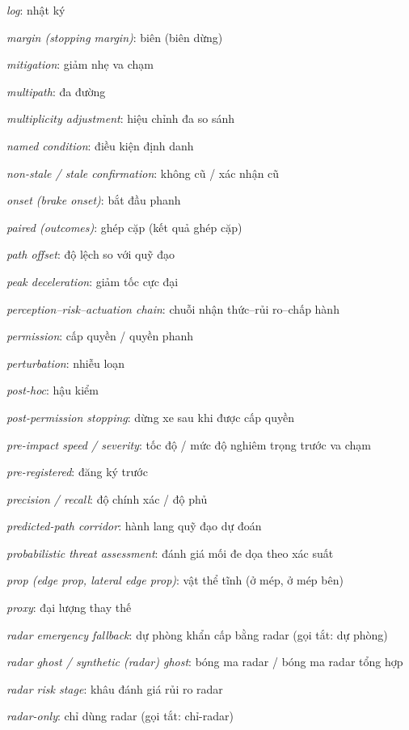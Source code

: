 \documentclass[conference]{IEEEtran}
\begin{document}
{\textit{log}: nhật ký\par
\textit{margin (stopping margin)}: biên (biên dừng)\par
\textit{mitigation}: giảm nhẹ va chạm\par
\textit{multipath}: đa đường\par
\textit{multiplicity adjustment}: hiệu chỉnh đa so sánh\par
\textit{named condition}: điều kiện định danh\par
\textit{non-stale / stale confirmation}: không cũ / xác nhận cũ\par
\textit{onset (brake onset)}: bắt đầu phanh\par
\textit{paired (outcomes)}: ghép cặp (kết quả ghép cặp)\par
\textit{path offset}: độ lệch so với quỹ đạo\par
\textit{peak deceleration}: giảm tốc cực đại\par
\textit{perception–risk–actuation chain}: chuỗi nhận thức–rủi ro–chấp hành\par
\textit{permission}: cấp quyền / quyền phanh\par
\textit{perturbation}: nhiễu loạn\par
\textit{post-hoc}: hậu kiểm\par
\textit{post-permission stopping}: dừng xe sau khi được cấp quyền\par
\textit{pre-impact speed / severity}: tốc độ / mức độ nghiêm trọng trước va chạm\par
\textit{pre-registered}: đăng ký trước\par
\textit{precision / recall}: độ chính xác / độ phủ\par
\textit{predicted-path corridor}: hành lang quỹ đạo dự đoán\par
\textit{probabilistic threat assessment}: đánh giá mối đe dọa theo xác suất\par
\textit{prop (edge prop, lateral edge prop)}: vật thể tĩnh (ở mép, ở mép bên)\par
\textit{proxy}: đại lượng thay thế\par
\textit{radar emergency fallback}: dự phòng khẩn cấp bằng radar (gọi tắt: dự phòng)\par
\textit{radar ghost / synthetic (radar) ghost}: bóng ma radar / bóng ma radar tổng hợp\par
\textit{radar risk stage}: khâu đánh giá rủi ro radar\par
\textit{radar-only}: chỉ dùng radar (gọi tắt: chỉ-radar)\par
}
\end{document}
